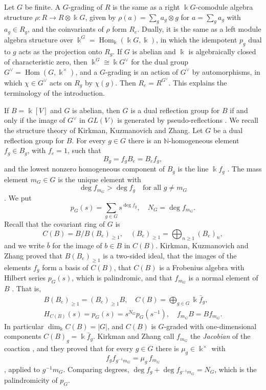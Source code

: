 \documentclass[reqno]{amsart}
\numberwithin{equation}{section}
\theoremstyle{definition}
\theoremstyle{remark}
\theoremstyle{plain}
\newcommand{\kk}{\Bbbk}
\DeclareMathOperator{\Hom}{Hom}
\begin{document}
Let $G$ be finite. A $G$-grading of $R$ is the same as a right $\kk G$-comodule algebra structure $\rho\colon R\to R\otimes\kk G$, given by $\rho(a)=\sum_ga_g\otimes g$ for $a=\sum_ga_g$ with $a_g\in R_g$, and the coinvariants of $\rho$ form $R_e$. Dually, it is the same as a left module algebra structure over $\kk^G=\Hom_\kk(\kk G,\kk)$, in which the idempotent $p_g$ dual to $g$ acts as the projection onto $R_g$. If $G$ is abelian and $\kk$ is algebraically closed of characteristic zero, then $\kk^G\cong\kk G^\vee$ for the dual group $G^\vee=\Hom(G,\kk^\times)$, and a $G$-grading is an action of $G^\vee$ by automorphisms, in which $\chi\in G^\vee$ acts on $R_g$ by $\chi(g)$. Then $R_e=R^{G^\vee}$. This explains the terminology of the introduction.

If $B=\kk[V]$ and $G$ is abelian, then $G$ is a dual reflection group for $B$ if and only if the image of $G^\vee$ in $GL(V)$ is generated by pseudo-reflections \cite{ST,Che}. We recall the structure theory of Kirkman, Kuzmanovich and Zhang. Let $G$ be a dual reflection group for $B$. For every $g\in G$ there is an $\mathbb N$-homogeneous element $f_g\in B_g$, with $f_e=1$, such that
\begin{equation}\label{YAMq9Fb2}
B_g=f_gB_e=B_ef_g,
\end{equation}
and the lowest nonzero homogeneous component of $B_g$ is the line $\kk f_g$ \cite[Theorems 0.3(1) and 3.5(1)]{KKZ}. The mass element $m_G\in G$ is the unique element with
\begin{equation}\label{YAMt3Kk6}
\deg f_{m_G}>\deg f_g\quad\text{for all }g\neq m_G
\end{equation}
\cite[Theorem 0.3(4)]{KKZ}. We put
\[
p_G(s)=\sum_{g\in G}s^{\deg f_g},\quad N_G=\deg f_{m_G}.
\]
Recall that the covariant ring of $G$ is
\[
C(B)=B/B(B_e)_{\ge1},\quad(B_e)_{\ge1}=\bigoplus_{n\ge1}(B_e)_n,
\]
and we write $\bar b$ for the image of $b\in B$ in $C(B)$. Kirkman, Kuzmanovich and Zhang proved that $B(B_e)_{\ge1}$ is a two-sided ideal, that the images of the elements $f_g$ form a basis of $C(B)$, that $C(B)$ is a Frobenius algebra with Hilbert series $p_G(s)$, which is palindromic, and that $f_{m_G}$ is a normal element of $B$ \cite[Theorems 0.4, 0.5(1) and 3.5]{KKZ}. That is,
\begin{equation}\label{YAMt4Kv0}
\begin{gathered}
B(B_e)_{\ge1}=(B_e)_{\ge1}B,\quad C(B)=\bigoplus_{g\in G}\kk\bar f_g,\\
H_{C(B)}(s)=p_G(s)=s^{N_G}p_G(s^{-1}),\quad f_{m_G}B=Bf_{m_G}.
\end{gathered}
\end{equation}
In particular $\dim_\kk C(B)=|G|$, and $C(B)$ is $G$-graded with one-dimensional components $C(B)_g=\kk\bar f_g$. Kirkman and Zhang call $f_{m_G}$ the \emph{Jacobian} of the coaction \cite[Definition 2.1]{KZ}, and they proved that for every $g\in G$ there is $\mu_g\in\kk^\times$ with
\begin{equation}\label{YAMe27Fm1}
f_gf_{g^{-1}m_G}=\mu_g\,f_{m_G}
\end{equation}
\cite[Lemma 2.11(2)]{KZ}, applied to $g^{-1}m_G$. Comparing degrees, $\deg f_g+\deg f_{g^{-1}m_G}=N_G$, which is the palindromicity of $p_G$.
\end{document}

